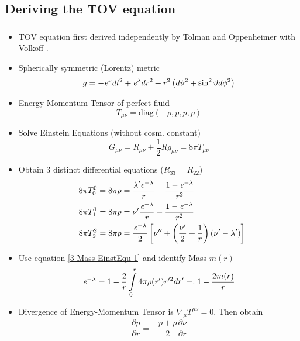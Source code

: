 \subsection{Deriving the TOV equation}
\begin{frame}
	\frametitle{\insertsubsection}
	\begin{itemize}[<+->]
		\item TOV equation first derived independently by Tolman and 
		Oppenheimer with Volkoff \cite{tolmanStaticSolutionsEinstein1939,oppenheimerMassiveNeutronCores1939}.
		\item Spherically symmetric (Lorentz) metric 
		\begin{equation}
			g=-\mathit{e}^\nu dt^2+\mathit{e}^\lambda dr^2+r^2\left(d\vartheta^2+\sin^2\vartheta d\phi^2\right)
		\end{equation}
		\item Energy-Momentum Tensor of perfect fluid
		\begin{equation}
			T_{\mu\nu}=\text{diag}(-\rho,p,p,p)
		\end{equation}
		\item Solve Einstein Equations (without cosm. constant)
		\begin{equation}
			G_{\mu\nu}=R_{\mu\nu}+\frac{1}{2}Rg_{\mu\nu}=8\pi T_{\mu\nu}
		\end{equation}
	\end{itemize}
\end{frame}

\begin{frame}
	\begin{itemize}[<+->]
		\item Obtain 3 distinct differential equations ($R_{33}=R_{22}$)
		\begin{align}
			-8\pi T_0^0 = 8\pi\rho &= \frac{\lambda'\mathit{e}^{-\lambda}}{r}+\frac{1-\mathit{e}^{-\lambda}}{r^2}\label{3-Mass-EinstEqu-1}\\
			8\pi T_1^1 = 8\pi p &= \nu'\frac{\mathit{e}^{-\lambda}}{r} - \frac{1-\mathit{e}^{-\lambda}}{r^2}\label{3-Mass-EinstEqu-2}\\
			8\pi T_2^2 = 8\pi p &= \frac{\mathit{e}^{-\lambda}}{2}\left[\nu''+\left(\frac{\nu'}{2} + \frac{1}{r}\right)\left(\nu'-\lambda'\right) \right]\label{3-Mass-EinstEqu-3}
		\end{align}
		\item Use equation \ref{3-Mass-EinstEqu-1} and identify Mass $m(r)$
		\begin{equation}
			\mathit{e}^{-\lambda}=1-\frac{2}{r}\int\limits_0^r 4\pi\rho(r')r'^2dr' =: 1-\frac{2m(r)}{r} 
			\label{3-Mass-MassDefinition}
		\end{equation}
		\item Divergence of Energy-Momentum Tensor is $\nabla_{\mu}T^{\mu\nu}=0$. Then obtain
		\begin{equation}
			\frac{\partial p}{\partial r} = -\frac{p+\rho}{2}\frac{\partial \nu}{\partial r}
			\label{3-Mass-EinstEquation2-Divergence}
		\end{equation}
	\end{itemize}
\end{frame}

